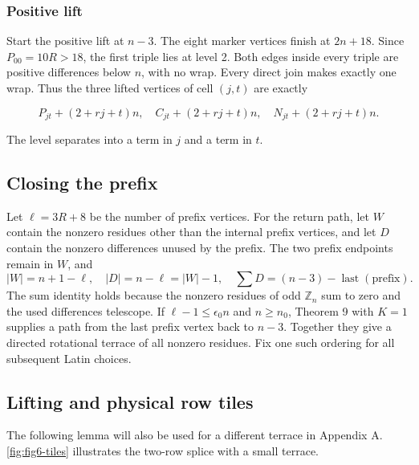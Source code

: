 \documentclass[11pt,a4paper]{article}
\begin{document}
\hypertarget{positive-lift}{%
\subsubsection{Positive lift}\label{positive-lift}}

Start the positive lift at \(n-3\). The eight marker vertices finish at \(2n+18\). Since \(P_{00}=10R>18\), the first triple lies at level 2. Both edges inside every triple are positive differences below \(n\), with no wrap. Every direct join makes exactly one wrap. Thus the three lifted vertices of cell \((j,t)\) are exactly

\begin{equation}
P_{jt}+(2+rj+t)n,\quad C_{jt}+(2+rj+t)n,\quad
N_{jt}+(2+rj+t)n.
\tag{L14}\label{eq:L14}
\end{equation}

The level separates into a term in \(j\) and a term in \(t\).

\hypertarget{closing-the-prefix}{%
\subsection{Closing the prefix}\label{closing-the-prefix}}

Let \(\ell=3R+8\) be the number of prefix vertices. For the return path, let \(W\) contain the nonzero residues other than the internal prefix vertices, and let \(D\) contain the nonzero differences unused by the prefix. The two prefix endpoints remain in \(W\), and \[
 |W|=n+1-\ell,\quad |D|=n-\ell=|W|-1,\quad
 \sum D=(n-3)-\operatorname{last}(\text{prefix}).
\] The sum identity holds because the nonzero residues of odd \(\mathbb Z_n\) sum to zero and the used differences telescope. If \(\ell-1\leq\epsilon_0 n\) and \(n\geq n_0\), Theorem 9 with \(K=1\) supplies a path from the last prefix vertex back to \(n-3\). Together they give a directed rotational terrace of all nonzero residues. Fix one such ordering for all subsequent Latin choices.

\hypertarget{lifting-and-physical-row-tiles}{%
\subsection{Lifting and physical row tiles}\label{lifting-and-physical-row-tiles}}

The following lemma will also be used for a different terrace in Appendix A. \autoref{fig:fig6-tiles} illustrates the two-row splice with a small terrace.
\end{document}
